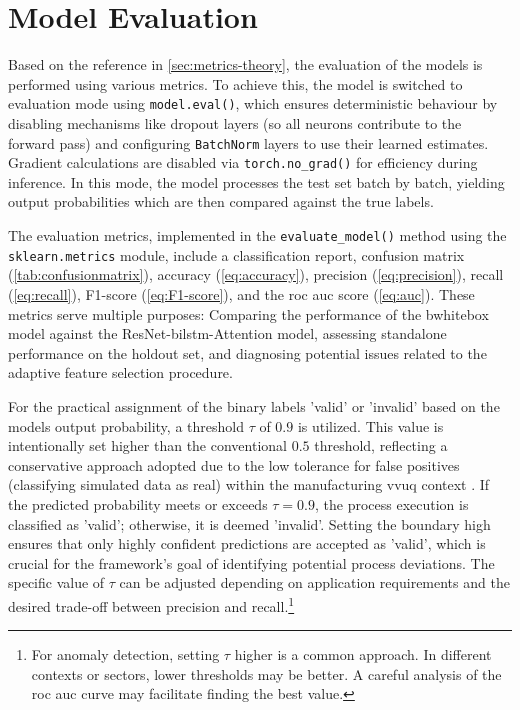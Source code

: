 \section{Model Evaluation}
\label{sec:model-evaluation}
Based on the reference in \autoref{sec:metrics-theory}, the evaluation of the models is performed using various metrics. To achieve this, the model is switched to evaluation mode using \texttt{model.eval()}, which ensures deterministic behaviour by disabling mechanisms like dropout layers (so all neurons contribute to the forward pass) and configuring \texttt{BatchNorm} layers to use their learned estimates. Gradient calculations are disabled via \texttt{torch.no\_grad()} for efficiency during inference. In this mode, the model processes the test set batch by batch, yielding output probabilities which are then compared against the true labels.

The evaluation metrics, implemented in the \texttt{evaluate\_model()} method using the \texttt{sklearn.metrics} module, include a classification report, confusion matrix (\autoref{tab:confusionmatrix}), accuracy (\autoref{eq:accuracy}), precision (\autoref{eq:precision}), recall (\autoref{eq:recall}), F1-score (\autoref{eq:F1-score}), and the \gls{roc} \gls{auc} score (\autoref{eq:auc}). These metrics serve multiple purposes: Comparing the performance of the bwhitebox model against the ResNet-\gls{bilstm}-Attention model, assessing standalone performance on the holdout set, and diagnosing potential issues related to the adaptive feature selection procedure.

For the practical assignment of the binary labels 'valid' or 'invalid' based on the models output probability, a threshold $\tau$ of $0.9$ is utilized. This value is intentionally set higher than the conventional $0.5$ threshold, reflecting a conservative approach adopted due to the low tolerance for false positives (classifying simulated data as real) within the manufacturing \gls{vvuq} context \autocite[\autoref{eq:precision}]{fahrmeir2016statistik}. If the predicted probability meets or exceeds $\tau = 0.9$, the process execution is classified as 'valid'; otherwise, it is deemed 'invalid'. Setting the boundary high ensures that only highly confident predictions are accepted as 'valid', which is crucial for the framework's goal of identifying potential process deviations. The specific value of $\tau$ can be adjusted depending on application requirements and the desired trade-off between precision and recall.\footnote{For anomaly detection, setting $\tau$ higher is a common approach. In different contexts or sectors, lower thresholds may be better. A careful analysis of the \gls{roc} \gls{auc} curve may facilitate finding the best value.}

